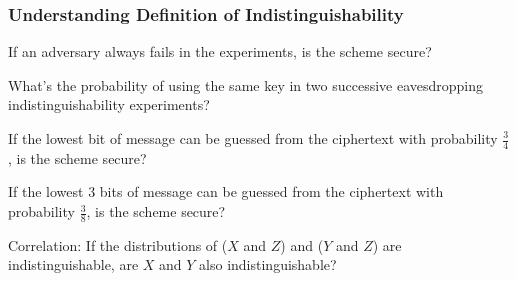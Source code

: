 \begin{frame}\frametitle{Understanding Definition of Indistinguishability}
\begin{exampleblock}{If an adversary always fails in the experiments, is the scheme secure?}
\end{exampleblock}
\begin{exampleblock}{What's the probability of using the same key in two successive eavesdropping indistinguishability experiments?}
\end{exampleblock}
\begin{exampleblock}{If the lowest bit of message can be guessed from the ciphertext with probability $\frac{3}{4}$, is the scheme secure?}
\end{exampleblock}
\begin{exampleblock}{If the lowest 3 bits of message can be guessed from the ciphertext with probability $\frac{3}{8}$, is the scheme secure?}
\end{exampleblock}
\begin{exampleblock}{Correlation: If the distributions of ($X$ and $Z$) and ($Y$ and $Z$) are indistinguishable, are $X$ and $Y$ also indistinguishable?}
\end{exampleblock}
\end{frame}
